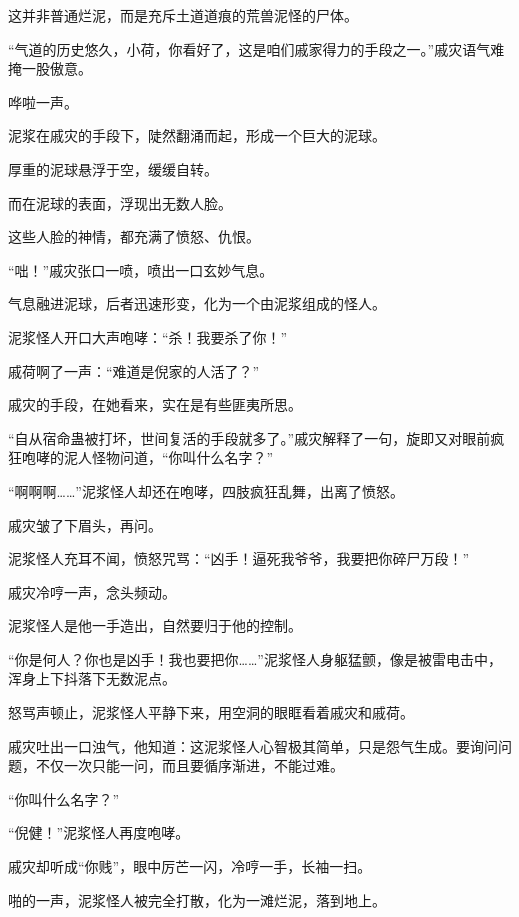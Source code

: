 \begin{this_body}
这并非普通烂泥，而是充斥土道道痕的荒兽泥怪的尸体。

“气道的历史悠久，小荷，你看好了，这是咱们戚家得力的手段之一。”戚灾语气难掩一股傲意。

哗啦一声。

泥浆在戚灾的手段下，陡然翻涌而起，形成一个巨大的泥球。

厚重的泥球悬浮于空，缓缓自转。

而在泥球的表面，浮现出无数人脸。

这些人脸的神情，都充满了愤怒、仇恨。

“咄！”戚灾张口一喷，喷出一口玄妙气息。

气息融进泥球，后者迅速形变，化为一个由泥浆组成的怪人。

泥浆怪人开口大声咆哮：“杀！我要杀了你！”

戚荷啊了一声：“难道是倪家的人活了？”

戚灾的手段，在她看来，实在是有些匪夷所思。

“自从宿命蛊被打坏，世间复活的手段就多了。”戚灾解释了一句，旋即又对眼前疯狂咆哮的泥人怪物问道，“你叫什么名字？”

“啊啊啊……”泥浆怪人却还在咆哮，四肢疯狂乱舞，出离了愤怒。

戚灾皱了下眉头，再问。

泥浆怪人充耳不闻，愤怒咒骂：“凶手！逼死我爷爷，我要把你碎尸万段！”

戚灾冷哼一声，念头频动。

泥浆怪人是他一手造出，自然要归于他的控制。

“你是何人？你也是凶手！我也要把你……”泥浆怪人身躯猛颤，像是被雷电击中，浑身上下抖落下无数泥点。

怒骂声顿止，泥浆怪人平静下来，用空洞的眼眶看着戚灾和戚荷。

戚灾吐出一口浊气，他知道：这泥浆怪人心智极其简单，只是怨气生成。要询问问题，不仅一次只能一问，而且要循序渐进，不能过难。

“你叫什么名字？”

“倪健！”泥浆怪人再度咆哮。

戚灾却听成“你贱”，眼中厉芒一闪，冷哼一手，长袖一扫。

啪的一声，泥浆怪人被完全打散，化为一滩烂泥，落到地上。

\end{this_body}

